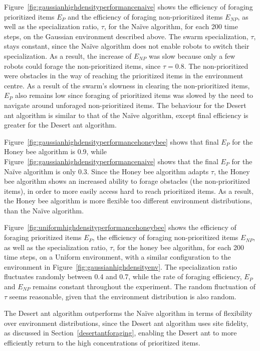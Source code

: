 Figure~\ref{fig:gaussianhighdensityperformancenaive} shows the efficiency of foraging prioritized items $E_P$ and the efficiency of foraging non-prioritized items $E_{NP}$, as well as the specialization ratio, $\tau$, for the Na\"ive algorithm, for each 200 time steps, on the Gaussian environment described above. The swarm specialization, $\tau$, stays constant, since the Na\"ive algorithm does not enable robots to switch their specialization. As a result, the increase of $E_{NP}$ was slow because only a few robots could forage the non-prioritized items, since $\tau=0.8$. The non-prioritized were obstacles in the way of reaching the prioritized items in the environment centre. As a result of the swarm's slowness in clearing the non-prioritized items, $E_P$ also remains low since foraging of prioritized items was slowed by the need to navigate around unforaged non-prioritized items. The behaviour for the Desert ant algorithm is similar to that of the Na\"ive algorithm, except final efficiency is greater for the Desert ant algorithm.

Figure~\ref{fig:gaussianhighdensityperformancehoneybee} shows that final $E_P$ for the Honey bee algorithm is 0.9, while Figure~\ref{fig:gaussianhighdensityperformancenaive} shows that the final $E_P$ for the Na\"ive algorithm is only 0.3. Since the Honey bee algorithm adapts $\tau$, the Honey bee algorithm shows an increased ability to forage obstacles (the non-prioritized items), in order to more easily access hard to reach prioritized items. As a result, the Honey bee algorithm is more flexible too different environment distributions, than the Na\"ive algorithm.

Figure~\ref{fig:uniformhighdensityperformancehoneybee} shows the efficiency of foraging prioritized items $E_P$, the efficiency of foraging non-prioritized items $E_{NP}$, as well as the specialization ratio, $\tau$, for the honey bee algorithm, for each 200 time steps, on a Uniform environment, with a similar configuration to the environment in Figure~\ref{fig:gaussianhighdensityenv}. The specialization ratio fluctuates randomly between 0.4 and 0.7, while the rate of foraging efficiency, $E_P$ and $E_{NP}$ remains constant throughout the experiment. The random fluctuation of $\tau$ seems reasonable, given that the environment distribution is also random.

The Desert ant algorithm outperforms the Na\"ive algorithm in terms of flexibility over environment distributions, since the Desert ant algorithm uses site fidelity, as discussed in Section~\ref{desertantforaging}, enabling the Desert ant to more efficiently return to the high concentrations of prioritized items.

